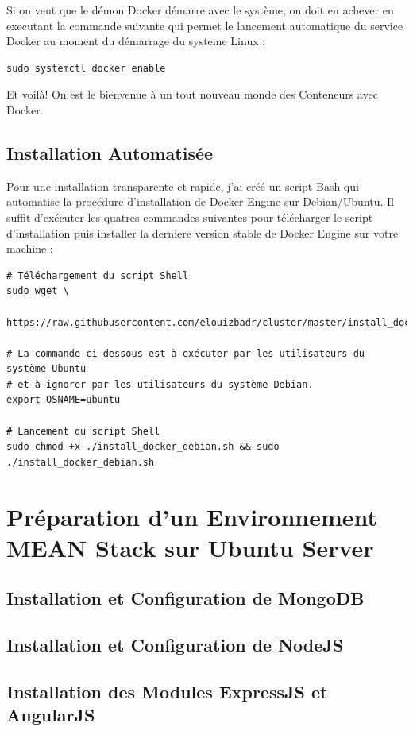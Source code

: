 \documentclass[a4paper,11pt,oneside]{report}
\begin{document}
\begin{appendices}
Si on veut que le démon Docker démarre avec le système, on doit en achever en executant la commande suivante qui permet le lancement automatique du service Docker au moment du démarrage du systeme Linux :

\begin{verbatim}
sudo systemctl docker enable
\end{verbatim}


Et voilà! On est le bienvenue à un tout nouveau monde des Conteneurs avec Docker.

\newpage

\section{Installation Automatisée}

Pour une installation transparente et rapide, j'ai créé un script Bash qui automatise la procédure d'installation de Docker Engine sur Debian/Ubuntu. Il suffit d'exécuter les quatres commandes suivantes pour télécharger le script d'installation puis installer la derniere version stable de Docker Engine sur votre machine :

\begin{verbatim}
# Téléchargement du script Shell
sudo wget \
  https://raw.githubusercontent.com/elouizbadr/cluster/master/install_docker_debian.sh

# La commande ci-dessous est à exécuter par les utilisateurs du système Ubuntu
# et à ignorer par les utilisateurs du système Debian.
export OSNAME=ubuntu 

# Lancement du script Shell
sudo chmod +x ./install_docker_debian.sh && sudo ./install_docker_debian.sh
\end{verbatim}

\chapter{Préparation d'un Environnement MEAN Stack sur Ubuntu Server}

\newpage

\section{Installation et Configuration de MongoDB}

\newpage

\section{Installation et Configuration de NodeJS}

\newpage

\section{Installation des Modules ExpressJS et AngularJS}

\end{appendices}





\newpage
\end{document}

